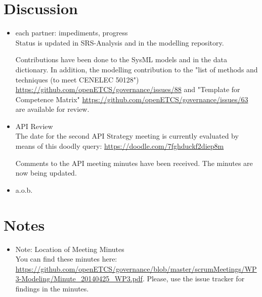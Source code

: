 \documentclass[a4paper, 11pt]{article}
\begin{document}
\section{Discussion}
\begin{itemize}
\item each partner: impediments, progress\\
Status is updated in SRS-Analysis and in the modelling repository. 

Contributions have been done to the SysML models and in the data dictionary. In addition, the modelling contribution to the "list of methods and techniques (to meet CENELEC 50128") \url{https://github.com/openETCS/governance/issues/88} and "Template for Competence Matrix" \url{https://github.com/openETCS/governance/issues/63} are available for review.

\item API Review\\
The date for the second API Strategy meeting is currently evaluated by means of this doodly query: \url{https://doodle.com/7fghduckf2diep8m}

Comments to the API meeting minutes have been received. The minutes are now being updated.

\item a.o.b.\\

\end{itemize}

\section{Notes}
\begin{itemize}

\item Note: Location of Meeting Minutes\\
You can find these minutes here: \url{https://github.com/openETCS/governance/blob/master/scrumMeetings/WP3-Modeling/Minute_20140425_WP3.pdf}. Please, use the issue tracker for findings in the minutes.

\end{itemize}
\end{document}
